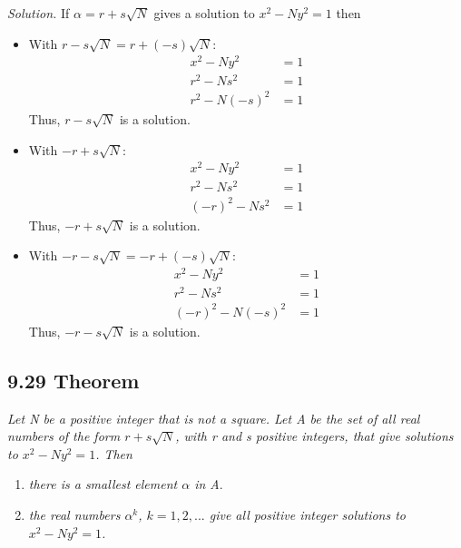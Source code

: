 \documentclass{article}
\begin{document}
\textit{Solution.} If $\alpha = r+s\sqrt{N}$ gives a solution to $x^2 - Ny^2 = 1$ then
\begin{itemize}
    \item With $r - s\sqrt{N} = r + (-s)\sqrt{N}$:
    \begin{align*}
        && x^2 - Ny^2 &= 1 &&\\ 
        && r^2 - Ns^2 &= 1 &&\\ 
        && r^2 - N(-s)^2 &= 1 &&
    \end{align*}
    Thus, $r - s\sqrt{N}$ is a solution.
    \item With $-r + s\sqrt{N}$:
    \begin{align*}
        && x^2 - Ny^2 &= 1 &&\\ 
        && r^2 - Ns^2 &= 1 &&\\ 
        && (-r)^2 - Ns^2 &= 1 &&
    \end{align*}
    Thus, $-r + s\sqrt{N}$ is a solution.
    \item With $-r - s\sqrt{N} = -r + (-s)\sqrt{N}$:
    \begin{align*}
        && x^2 - Ny^2 &= 1 &&\\ 
        && r^2 - Ns^2 &= 1 &&\\ 
        && (-r)^2 - N(-s)^2 &= 1 &&
    \end{align*}
    Thus, $-r - s\sqrt{N}$ is a solution.
\end{itemize}

\subsection*{9.29 Theorem} 
\quad \textit{Let N be a positive integer that is not a square. Let A be the set of all real numbers of the form $r + s\sqrt{N}$, with r and s positive integers, that give solutions to $x^2 - Ny^2 = 1$. Then}
\begin{enumerate}
    \item \textit{there is a smallest element $\alpha$ in A}.
    \item \textit{the real numbers $\alpha^k$, $k = 1,2,...$ give all positive integer solutions to $x^2  -Ny^2 = 1$.}
\end{enumerate}
\end{document}
